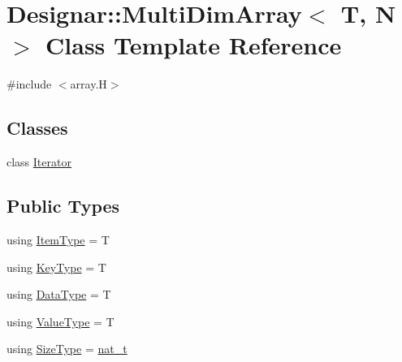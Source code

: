 \hypertarget{class_designar_1_1_multi_dim_array}{}\section{Designar\+:\+:Multi\+Dim\+Array$<$ T, N $>$ Class Template Reference}
\label{class_designar_1_1_multi_dim_array}


{\ttfamily \#include $<$array.\+H$>$}

\subsection*{Classes}
\begin{DoxyCompactItemize}
\item 
class \hyperlink{class_designar_1_1_multi_dim_array_1_1_iterator}{Iterator}
\end{DoxyCompactItemize}
\subsection*{Public Types}
\begin{DoxyCompactItemize}
\item 
using \hyperlink{class_designar_1_1_multi_dim_array_a1b4c346c7e11cbada54447843d0c7880}{Item\+Type} = T
\item 
using \hyperlink{class_designar_1_1_multi_dim_array_aa8c6b455e3cd5b74a57243a13553c6ff}{Key\+Type} = T
\item 
using \hyperlink{class_designar_1_1_multi_dim_array_a23b3bec3a6a803d8ef7becceb592d6c0}{Data\+Type} = T
\item 
using \hyperlink{class_designar_1_1_multi_dim_array_aecea28d754897523cdfa68bc28b829d3}{Value\+Type} = T
\item 
using \hyperlink{class_designar_1_1_multi_dim_array_a45c10514739f65d38ae3749569739267}{Size\+Type} = \hyperlink{namespace_designar_aa72662848b9f4815e7bf31a7cf3e33d1}{nat\+\_\+t}
\end{DoxyCompactItemize}
